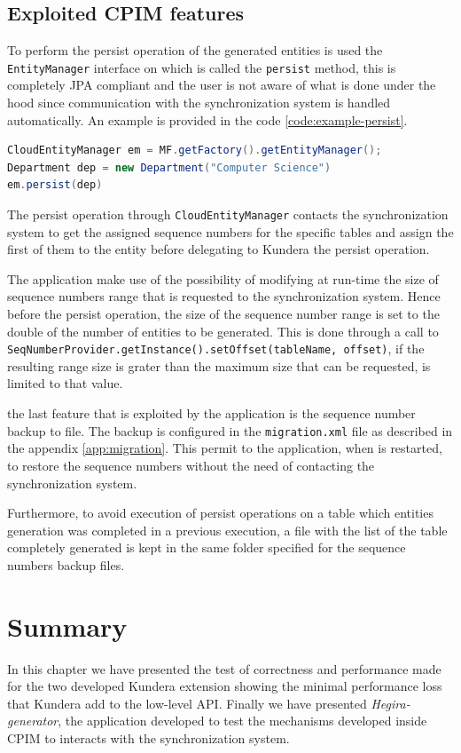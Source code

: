 \subsection{Exploited CPIM features}
To perform the persist operation of the generated entities is used the \texttt{EntityManager} interface on which is called the \texttt{persist} method, this is completely JPA compliant and the user is not aware of what is done under the hood since communication with the synchronization system is handled automatically. An example is provided in the code \ref{code:example-persist}.

\begin{lstlisting}[language=Java, caption=Persisting entities in CPIM, label=code:example-persist]
CloudEntityManager em = MF.getFactory().getEntityManager();
Department dep = new Department("Computer Science")
em.persist(dep)
\end{lstlisting}

\noindent The persist operation through \texttt{CloudEntityManager} contacts the synchronization system to get the assigned sequence numbers for the specific tables and assign the first of them to the entity before delegating to Kundera the persist operation.

\newparagraph The application make use of the possibility of modifying at run-time the size of sequence numbers range that is requested to the synchronization system. Hence before the persist operation, the size of the sequence number range is set to the double of the number of entities to be generated. This is done through a call to \texttt{SeqNumberProvider.getInstance().setOffset(tableName, offset)}, if the resulting range size is grater than the maximum size that can be requested, is limited to that value. 

\newparagraph the last feature that is exploited by the application is the sequence number backup to file. The backup is configured in the \texttt{migration.xml} file as described in the appendix \ref{app:migration}.
This permit to the application, when is restarted, to restore the sequence numbers without the need of contacting the synchronization system.

\noindent Furthermore, to avoid execution of persist operations on a table which entities generation was completed in a previous execution, a file with the list of the table completely generated is kept in the same folder specified for the sequence numbers backup files.

\section{Summary}
In this chapter we have presented the test of correctness and performance made for the two developed Kundera extension showing the minimal performance loss that Kundera add to the low-level API.
Finally we have presented \textit{Hegira-generator}, the application developed to test the mechanisms developed inside CPIM to interacts with the synchronization system.
